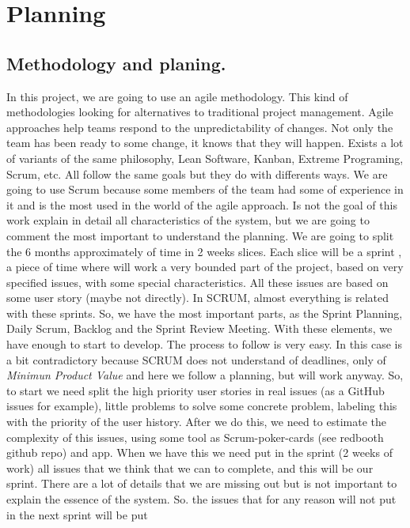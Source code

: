\chapter{Planning}
\section{Methodology and planing.}

In this project, we are going to use an agile methodology.
This kind of methodologies looking for alternatives to traditional project management.
Agile approaches help teams respond to the unpredictability of changes.
Not only the team has been ready to some change, it knows that they will happen.
\intro
Exists a lot of variants of the same philosophy, Lean Software, Kanban,
Extreme Programing, Scrum, etc.
All follow the same goals but they do with differents ways.
\intro
We are going to use Scrum because some members of the team had some of experience
in it and is the most used in the world of the agile approach.
Is not the goal of this work explain in detail all characteristics of the system,
but we are going to comment the most important to understand the planning.
\intro
We are going to split the 6 months approximately of time in 2 weeks slices.
Each slice will be a sprint , a piece of time where will work a very bounded part
of the project, based on very specified issues, with some special characteristics.
All these issues are based on some user story (maybe not directly).
\intro
In SCRUM, almost everything is related with these sprints. So, we have the most
important parts, as the Sprint Planning, Daily Scrum, Backlog and the Sprint
Review Meeting. With these elements, we have enough to start to develop.
The process to follow is very easy. In this case is a bit contradictory because
SCRUM does not understand of deadlines, only of \textit{Minimun Product Value}
and here we follow a planning, but will work anyway.
\intro
So, to start we need split the high priority user stories in real issues (as a
GitHub issues for example), little problems to solve some concrete problem,
labeling this with the priority of the user history.
After we do this, we need to estimate the complexity of this issues, using some
tool as Scrum-poker-cards (see redbooth github repo) and app.  When we have this
we need put in the sprint (2 weeks of work) all issues that we think that we can
to complete, and this will be our sprint.
\intro
There are a lot of details that we are missing out but is not important to explain
the essence of the system.
So. the issues that for any reason will not put in the next sprint will be put
